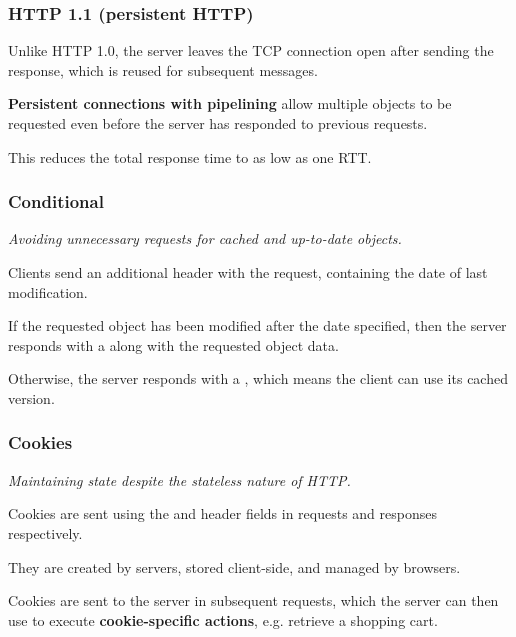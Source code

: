 \subsubsection{HTTP 1.1 (persistent HTTP)}
Unlike HTTP 1.0, the server leaves the TCP connection open after sending the response, which is reused for subsequent messages.

\textbf{Persistent connections with pipelining} allow multiple objects to be requested even before the server
has responded to previous requests.

This reduces the total response time to as low as one RTT.

\subsubsection{Conditional }
\emph{Avoiding unnecessary requests for cached and up-to-date objects.}

Clients send an additional  header with the request, containing the date of last modification.

If the requested object has been modified after the date specified, then the server responds with a  along
with the requested object data.

Otherwise, the server responds with a , which means the client can use its cached version.

\subsubsection{Cookies}
\emph{Maintaining state despite the stateless nature of HTTP.}

Cookies are sent using the  and  header fields in requests and responses respectively.

They are created by servers, stored client-side, and managed by browsers.

Cookies are sent to the server in subsequent requests,
which the server can then use to execute \textbf{cookie-specific actions}, e.g. retrieve a shopping cart.